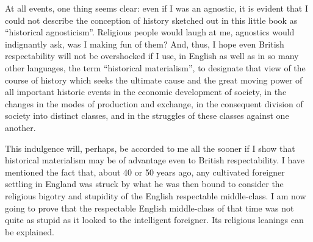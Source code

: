 At all events, one thing seems clear: even if I was an agnostic, it is evident
that I could not describe the conception of history sketched out in this little
book as ``historical agnosticism''. Religious people would laugh at me,
agnostics would indignantly ask, was I making fun of them? And, thus, I hope
even British respectability will not be overshocked if I use, in English as
well as in so many other languages, the term ``historical materialism'', to
designate that view of the course of history which seeks the ultimate cause and
the great moving power of all important historic events in the economic
development of society, in the changes in the modes of production and exchange,
in the consequent division of society into distinct classes, and in the
struggles of these classes against one another.

This indulgence will, perhaps, be accorded to me all the sooner if I show that
historical materialism may be of advantage even to British respectability. I
have mentioned the fact that, about 40 or 50 years ago, any cultivated
foreigner settling in England was struck by what he was then bound to consider
the religious bigotry and stupidity of the English respectable middle-class. I
am now going to prove that the respectable English middle-class of that time
was not quite as stupid as it looked to the intelligent foreigner. Its
religious leanings can be explained.
